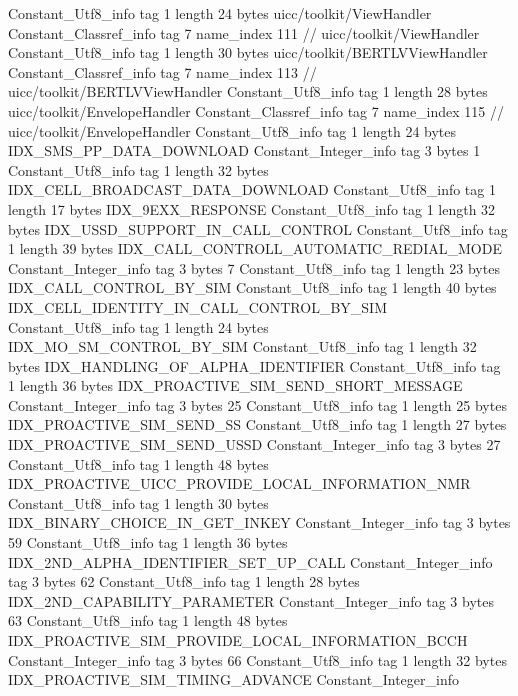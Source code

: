 {{{		}
		Constant_Utf8_info {
			tag	1
			length	24
			bytes	uicc/toolkit/ViewHandler
		}
		Constant_Classref_info {
			tag	7
			name_index	111		// uicc/toolkit/ViewHandler
		}
		Constant_Utf8_info {
			tag	1
			length	30
			bytes	uicc/toolkit/BERTLVViewHandler
		}
		Constant_Classref_info {
			tag	7
			name_index	113		// uicc/toolkit/BERTLVViewHandler
		}
		Constant_Utf8_info {
			tag	1
			length	28
			bytes	uicc/toolkit/EnvelopeHandler
		}
		Constant_Classref_info {
			tag	7
			name_index	115		// uicc/toolkit/EnvelopeHandler
		}
		Constant_Utf8_info {
			tag	1
			length	24
			bytes	IDX_SMS_PP_DATA_DOWNLOAD
		}
		Constant_Integer_info {
			tag	3
			bytes	1
		}
		Constant_Utf8_info {
			tag	1
			length	32
			bytes	IDX_CELL_BROADCAST_DATA_DOWNLOAD
		}
		Constant_Utf8_info {
			tag	1
			length	17
			bytes	IDX_9EXX_RESPONSE
		}
		Constant_Utf8_info {
			tag	1
			length	32
			bytes	IDX_USSD_SUPPORT_IN_CALL_CONTROL
		}
		Constant_Utf8_info {
			tag	1
			length	39
			bytes	IDX_CALL_CONTROLL_AUTOMATIC_REDIAL_MODE
		}
		Constant_Integer_info {
			tag	3
			bytes	7
		}
		Constant_Utf8_info {
			tag	1
			length	23
			bytes	IDX_CALL_CONTROL_BY_SIM
		}
		Constant_Utf8_info {
			tag	1
			length	40
			bytes	IDX_CELL_IDENTITY_IN_CALL_CONTROL_BY_SIM
		}
		Constant_Utf8_info {
			tag	1
			length	24
			bytes	IDX_MO_SM_CONTROL_BY_SIM
		}
		Constant_Utf8_info {
			tag	1
			length	32
			bytes	IDX_HANDLING_OF_ALPHA_IDENTIFIER
		}
		Constant_Utf8_info {
			tag	1
			length	36
			bytes	IDX_PROACTIVE_SIM_SEND_SHORT_MESSAGE
		}
		Constant_Integer_info {
			tag	3
			bytes	25
		}
		Constant_Utf8_info {
			tag	1
			length	25
			bytes	IDX_PROACTIVE_SIM_SEND_SS
		}
		Constant_Utf8_info {
			tag	1
			length	27
			bytes	IDX_PROACTIVE_SIM_SEND_USSD
		}
		Constant_Integer_info {
			tag	3
			bytes	27
		}
		Constant_Utf8_info {
			tag	1
			length	48
			bytes	IDX_PROACTIVE_UICC_PROVIDE_LOCAL_INFORMATION_NMR
		}
		Constant_Utf8_info {
			tag	1
			length	30
			bytes	IDX_BINARY_CHOICE_IN_GET_INKEY
		}
		Constant_Integer_info {
			tag	3
			bytes	59
		}
		Constant_Utf8_info {
			tag	1
			length	36
			bytes	IDX_2ND_ALPHA_IDENTIFIER_SET_UP_CALL
		}
		Constant_Integer_info {
			tag	3
			bytes	62
		}
		Constant_Utf8_info {
			tag	1
			length	28
			bytes	IDX_2ND_CAPABILITY_PARAMETER
		}
		Constant_Integer_info {
			tag	3
			bytes	63
		}
		Constant_Utf8_info {
			tag	1
			length	48
			bytes	IDX_PROACTIVE_SIM_PROVIDE_LOCAL_INFORMATION_BCCH
		}
		Constant_Integer_info {
			tag	3
			bytes	66
		}
		Constant_Utf8_info {
			tag	1
			length	32
			bytes	IDX_PROACTIVE_SIM_TIMING_ADVANCE
		}
		Constant_Integer_info {
}}}
